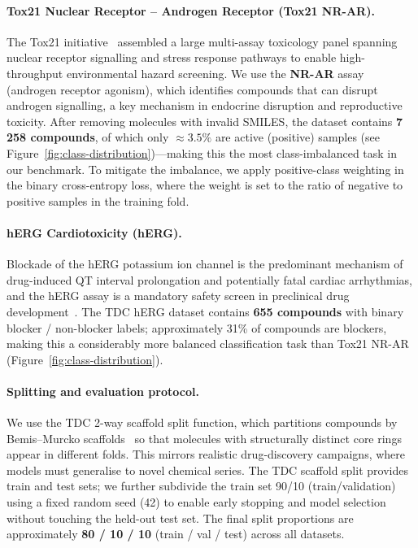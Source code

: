\documentclass[12pt]{article}
\begin{document}
\paragraph{Tox21 Nuclear Receptor -- Androgen Receptor (Tox21 NR-AR).}
The Tox21 initiative~\cite{tox21data} assembled a large multi-assay toxicology
panel spanning nuclear receptor signalling and stress response pathways to enable
high-throughput environmental hazard screening.  We use the \textbf{NR-AR} assay
(androgen receptor agonism), which identifies compounds that can disrupt androgen
signalling, a key mechanism in endocrine disruption and reproductive
toxicity.  After removing molecules with invalid SMILES, the dataset contains
\textbf{7\,258 compounds}, of which only $\approx3.5\%$ are active (positive) samples
(see Figure~\ref{fig:class-distribution})---making this the most class-imbalanced
task in our benchmark.  To mitigate the imbalance, we apply positive-class
weighting in the binary cross-entropy loss, where the weight is set to the ratio of
negative to positive samples in the training fold.

\paragraph{hERG Cardiotoxicity (hERG).}
Blockade of the hERG potassium ion channel is the predominant mechanism of
drug-induced QT interval prolongation and potentially fatal cardiac arrhythmias,
and the hERG assay is a mandatory safety screen in preclinical drug
development~\cite{sanguinetti2006herg}.  The TDC hERG dataset contains
\textbf{655 compounds} with binary blocker / non-blocker labels; approximately
31\% of compounds are blockers, making this a considerably more balanced
classification task than Tox21 NR-AR (Figure~\ref{fig:class-distribution}).

\paragraph{Splitting and evaluation protocol.}
We use the TDC 2-way scaffold split function, which partitions compounds by
Bemis--Murcko scaffolds~\cite{doi:10.1021/jm9602928} so that molecules with
structurally distinct core rings appear in different folds.  This mirrors realistic
drug-discovery campaigns, where models must generalise to novel chemical series.  The
TDC scaffold split provides train and test sets; we further subdivide the train set
90/10 (train/validation) using a fixed random seed (42) to enable early stopping and
model selection without touching the held-out test set.  The final split proportions
are approximately \textbf{80 / 10 / 10} (train / val / test) across all datasets.
\end{document}
